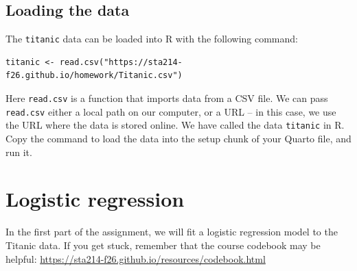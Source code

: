\documentclass[11pt]{article}
\begin{document}
\subsection*{Loading the data}

The \verb;titanic; data can be loaded into R with the following command:

\begin{verbatim}
titanic <- read.csv("https://sta214-f26.github.io/homework/Titanic.csv")
\end{verbatim}

\noindent Here \texttt{read.csv} is a function that imports data from a CSV file. We can pass \texttt{read.csv} either a local path on our computer, or a URL -- in this case, we use the URL where the data is stored online. We have called the data \verb;titanic; in R.\\

\noindent Copy the command to load the data into the setup chunk of your Quarto file, and run it.

\newpage

\section{Logistic regression}

In the first part of the assignment, we will fit a logistic regression model to the Titanic data. If you get stuck, remember that the course codebook may be helpful: \url{https://sta214-f26.github.io/resources/codebook.html} 
\end{document}
